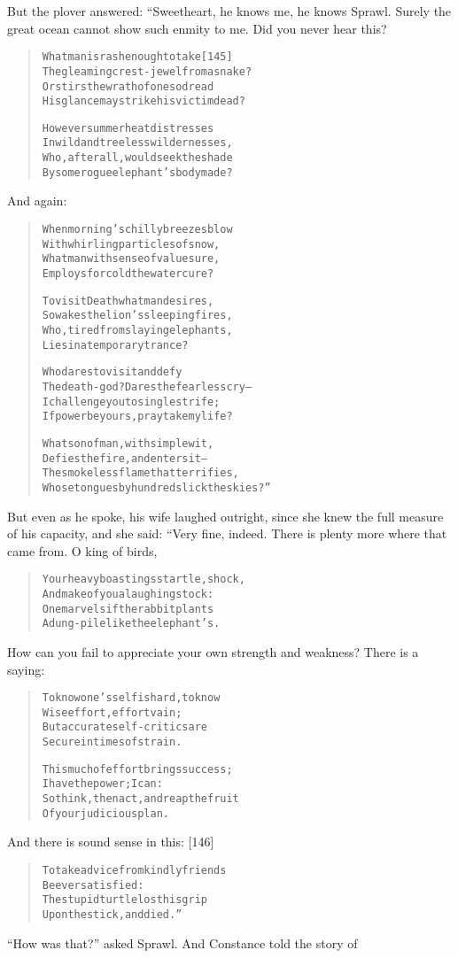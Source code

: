\documentclass[article, twoside, 14pt]{memoir}
\renewenvironment{verbatim}{%
\begin{quote}%
\vskip -10pt%
\begin{alltt}\normalfont\large}{\end{alltt}%
\end{quote}%
\vskip -10pt
} %
\begin{document}
But the plover answered: “Sweetheart, he knows me, he knows Sprawl.
Surely the great ocean cannot show such enmity to me. Did you never
hear this?

\begin{verbatim}
What man is rash enough to take                         [145]
The gleaming crest-jewel from a snake?
Or stirs the wrath of one so dread
His glance may strike his victim dead?

However summer heat distresses
In wild and treeless wildernesses,
Who, after all, would seek the shade
By some rogue elephant's body made?
\end{verbatim}
And again:

\begin{verbatim}
When morning's chilly breezes blow
With whirling particles of snow,
What man with sense of value sure,
Employs for cold the water cure?

To visit Death what man desires,
So wakes the lion's sleeping fires,
Who, tired from slaying elephants,
Lies in a temporary trance?

Who dares to visit and defy
The death-god? Dares the fearless cry--
I challenge you to single strife;
If power be yours, pray take my life?

What son of man, with simple wit,
Defies the fire, and enters it--
The smokeless flame that terrifies,
Whose tongues by hundreds lick the skies?”
\end{verbatim}
But even as he spoke, his wife laughed outright, since she knew the
full measure of his capacity, and she said: “Very fine, indeed.
There is plenty more where that came from. O king of birds,

\begin{verbatim}
Your heavy boastings startle, shock,
And make of you a laughingstock:
One marvels if the rabbit plants
A dung-pile like the elephant's.
\end{verbatim}
How can you fail to appreciate your own strength and weakness?
There is a saying:

\begin{verbatim}
To know one's self is hard, to know
Wise effort, effort vain;
But accurate self-critics are
Secure in times of strain.

This much of effort brings success;
I have the power; I can:
So think, then act, and reap the fruit
Of your judicious plan.
\end{verbatim}
And there is sound sense in this: [146]

\begin{verbatim}
To take advice from kindly friends
Be ever satisfied:
The stupid turtle lost his grip
Upon the stick, and died.”
\end{verbatim}
``How was that?'' asked Sprawl. And Constance told the story of
\end{document}
